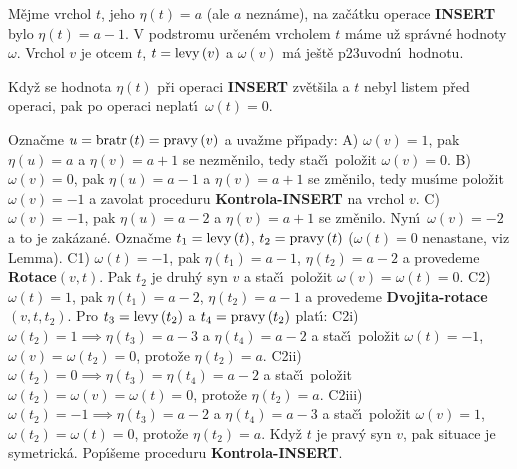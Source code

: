 \flushpar M\v ejme vrchol $t$, jeho $\eta \left(t\right)=a$ (ale $a$ nezn\'ame), na 
za\v c\'atku 
ope\-ra\-ce {\bf INSERT} bylo $\eta \left(t\right)=a-1$.  V podstromu ur\v cen\'em 
vrcholem $t$ m\'ame u\v z spr\'avn\'e hodnoty $\omega$.  Vrchol $
v$ je otcem $t$, 
$t=\operatorname{levy}\left(v\right)$ a $\omega \left(v\right)$ m\'a je\v st\v e p\accent23uvodn\'\i\ hodnotu.  
\medskip

Kdy\v z se hodnota $\eta \left(t\right)$ p\v ri operaci {\bf INSERT }
zv\v et\v sila a $t$ nebyl listem p\v red operaci, pak po operaci 
neplat\'\i\ $\omega \left(t\right)=0$.
\endproclaim

\flushpar Ozna\v cme $u=\operatorname{bratr}\left(t\right)=\operatorname{pravy}\left(v\right)$ a uva\v zme p\v r\'\i pady:\newline 
A) $\omega \left(v\right)=1$, pak $\eta \left(u\right)=a$ a $\eta \left(v\right)=a+1$ se nezm\v enilo, 
tedy sta\v c\'\i\ polo\v zit $\omega \left(v\right)=0$.\newline 
B) $\omega \left(v\right)=0$, pak $\eta \left(u\right)=a-1$ a $\eta \left(v\right)=a+1$ se zm\v enilo, 
tedy mus\'\i me polo\v zit $\omega \left(v\right)=-1$ a zavolat proceduru 
{\bf Kontrola-INSERT} na vrchol $v$.\newline 
C) $\omega \left(v\right)=-1$, pak $\eta \left(u\right)=a-2$ a $\eta \left(v\right)=a+1$ se zm\v enilo. 
Nyn\'\i\ $\omega \left(v\right)=-2$ a to je zak\'azan\'e. Ozna\v cme $t_1=\operatorname{levy}
\left(t\right)$, 
$t_2=\operatorname{pravy}\left(t\right)$ ($\omega \left(t\right)=0$ nenastane, viz Lemma). 
\newline 
C1) $\omega \left(t\right)=-1$, pak $\eta \left(t_1\right)=a-1$, $\eta \left(t_2\right)=a-2$ a provedeme 
{\bf Rotace$\left(v,t\right)$}. Pak $t_2$ je druh\'y syn $v$ a sta\v c\'\i\ polo\v zit 
$\omega \left(v\right)=\omega \left(t\right)=0$.\newline 
C2) $\omega \left(t\right)=1$, pak $\eta \left(t_1\right)=a-2$, $\eta \left(t_2\right)=a-1$ a provedeme 
{\bf Dvojita-rotace$\left(v,t,t_2\right)$}. Pro $t_3=\operatorname{levy}\left(t_2\right)$ a $t_4=\operatorname{pravy}
\left(t_2\right)$ 
plat\'\i :\newline 
C2i) $\omega \left(t_2\right)=1\implies\eta \left(t_3\right)=a-3$ a $\eta \left(t_4\right)=a-2$ a sta\v c\'\i\ 
polo\v zit $\omega \left(t\right)=-1$, $\omega \left(v\right)=\omega \left(t_2\right)=0$, proto\v ze $
\eta \left(t_2\right)=a$.\newline 
C2ii) $\omega \left(t_2\right)=0\implies\eta \left(t_3\right)=\eta \left(t_4\right)=a-2$ a sta\v c\'\i\ polo\v zit 
$\omega \left(t_2\right)=\omega \left(v\right)=\omega \left(t\right)=0$, proto\v ze $\eta \left(t_2\right)=a$. \newline 
C2iii) $\omega \left(t_2\right)=-1\implies\eta \left(t_3\right)=a-2$ a $\eta \left(t_4\right)=a-3$ a 
sta\v c\'\i\ polo\v zit $\omega \left(v\right)=1$, $\omega \left(t_2\right)=\omega \left(t\right)=
0$, proto\v ze $\eta \left(t_2\right)=a$.\newline 
Kdy\v z $t$ je prav\'y syn $v$, pak situace je symetrick\'a.\newline 
Pop\'\i\v seme proceduru {\bf Kontrola-INSERT}.
\medskip

